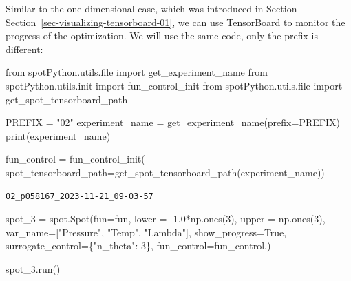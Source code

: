 \documentclass[
  letterpaper,
  DIV=11,
  numbers=noendperiod]{scrreprt}
\newenvironment{Shaded}{\begin{snugshade}}{\end{snugshade}}
\newcommand{\BuiltInTok}[1]{\textcolor[rgb]{0.00,0.23,0.31}{#1}}
\newcommand{\DecValTok}[1]{\textcolor[rgb]{0.68,0.00,0.00}{#1}}
\newcommand{\FloatTok}[1]{\textcolor[rgb]{0.68,0.00,0.00}{#1}}
\newcommand{\ImportTok}[1]{\textcolor[rgb]{0.00,0.46,0.62}{#1}}
\newcommand{\NormalTok}[1]{\textcolor[rgb]{0.00,0.23,0.31}{#1}}
\newcommand{\OperatorTok}[1]{\textcolor[rgb]{0.37,0.37,0.37}{#1}}
\newcommand{\StringTok}[1]{\textcolor[rgb]{0.13,0.47,0.30}{#1}}
\newcommand{\VariableTok}[1]{\textcolor[rgb]{0.07,0.07,0.07}{#1}}
\begin{document}
\begin{tcolorbox}[enhanced jigsaw, rightrule=.15mm, opacityback=0, colframe=quarto-callout-note-color-frame, opacitybacktitle=0.6, toptitle=1mm, arc=.35mm, colbacktitle=quarto-callout-note-color!10!white, coltitle=black, toprule=.15mm, leftrule=.75mm, titlerule=0mm, title=\textcolor{quarto-callout-note-color}{\faInfo}\hspace{0.5em}{TensorBoard}, bottomrule=.15mm, breakable, bottomtitle=1mm, left=2mm, colback=white]

Similar to the one-dimensional case, which was introduced in Section
Section~\ref{sec-visualizing-tensorboard-01}, we can use TensorBoard to
monitor the progress of the optimization. We will use the same code,
only the prefix is different:

\begin{Shaded}
\begin{Highlighting}[]
\ImportTok{from}\NormalTok{ spotPython.utils.}\BuiltInTok{file} \ImportTok{import}\NormalTok{ get\_experiment\_name}
\ImportTok{from}\NormalTok{ spotPython.utils.init }\ImportTok{import}\NormalTok{ fun\_control\_init}
\ImportTok{from}\NormalTok{ spotPython.utils.}\BuiltInTok{file} \ImportTok{import}\NormalTok{ get\_spot\_tensorboard\_path}

\NormalTok{PREFIX }\OperatorTok{=} \StringTok{"02"}
\NormalTok{experiment\_name }\OperatorTok{=}\NormalTok{ get\_experiment\_name(prefix}\OperatorTok{=}\NormalTok{PREFIX)}
\BuiltInTok{print}\NormalTok{(experiment\_name)}

\NormalTok{fun\_control }\OperatorTok{=}\NormalTok{ fun\_control\_init(}
\NormalTok{    spot\_tensorboard\_path}\OperatorTok{=}\NormalTok{get\_spot\_tensorboard\_path(experiment\_name))}
\end{Highlighting}
\end{Shaded}

\begin{verbatim}
02_p058167_2023-11-21_09-03-57
\end{verbatim}

\end{tcolorbox}

\begin{Shaded}
\begin{Highlighting}[]
\NormalTok{spot\_3 }\OperatorTok{=}\NormalTok{ spot.Spot(fun}\OperatorTok{=}\NormalTok{fun,}
\NormalTok{                   lower }\OperatorTok{=} \OperatorTok{{-}}\FloatTok{1.0}\OperatorTok{*}\NormalTok{np.ones(}\DecValTok{3}\NormalTok{),}
\NormalTok{                   upper }\OperatorTok{=}\NormalTok{ np.ones(}\DecValTok{3}\NormalTok{),}
\NormalTok{                   var\_name}\OperatorTok{=}\NormalTok{[}\StringTok{"Pressure"}\NormalTok{, }\StringTok{"Temp"}\NormalTok{, }\StringTok{"Lambda"}\NormalTok{],}
\NormalTok{                   show\_progress}\OperatorTok{=}\VariableTok{True}\NormalTok{,}
\NormalTok{                   surrogate\_control}\OperatorTok{=}\NormalTok{\{}\StringTok{"n\_theta"}\NormalTok{: }\DecValTok{3}\NormalTok{\},}
\NormalTok{                   fun\_control}\OperatorTok{=}\NormalTok{fun\_control,)}

\NormalTok{spot\_3.run()}
\end{Highlighting}
\end{Shaded}
\end{document}
